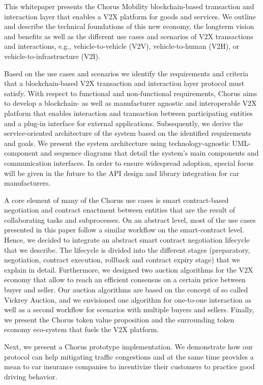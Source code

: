 \documentclass{llncs}
\begin{document}
{		This whitepaper presents the Chorus Mobility blockchain-based transaction and interaction layer that enables a V2X platform for goods and services. We outline and describe the technical foundations of this new economy, the longterm vision and benefits as well as the different use cases and scenarios of V2X transactions and interactions, e.g., vehicle-to-vehicle (V2V), vehicle-to-human (V2H), or vehicle-to-infrastructure (V2I).
		
		Based on the use cases and scenarios we identify the requirements and criteria that a blockchain-based V2X transaction and interaction layer protocol must satisfy. With respect to functional and non-functional requirements, Chorus aims to develop a blockchain- as well as manufacturer agnostic and interoperable V2X platform that enables interaction and transaction between participating entities and a plug-in interface for external applications.
		Subsequently, we derive the service-oriented architecture of the system based on the identified requirements and goals. We present the system architecture using technology-agnostic UML-component and sequence diagrams that detail the system’s main components and communication interfaces. In order to ensure widespread adoption, special focus will be given in the future to the API design and library integration for car manufacturers.
		
		A core element of many of the Chorus use cases is smart contract-based negotiation and contract enactment between
		entities that are the result of collaborating tasks and subprocesses. On an abstract level, most of the use cases presented in this paper follow a similar workflow on the smart-contract level. Hence, we decided to integrate an abstract smart contract negotiation lifecycle that we describe. The lifecycle is divided into the different stages (preparatory, negotiation, contract execution, rollback and contract expiry stage) that we explain in detail. Furthermore, we designed two auction algorithms for the V2X economy that allow to reach an efficient consensus on a certain price between buyer and seller. Our auction algorithms are based on the concept of so called Vickrey Auction, and we envisioned one algorithm for one-to-one interaction as well as a second workflow for scenarios with multiple buyers and sellers. Finally, we present the Chorus token value proposition and the surrounding token economy eco-system that fuels the V2X platform.
		
		Next, we present a Chorus prototype implementation. We demonstrate how our protocol can help mitigating traffic congestions and at the same time provides a mean to car insurance companies to incentivize their customers to practice good driving behavior. 	
		
}
\end{document}
